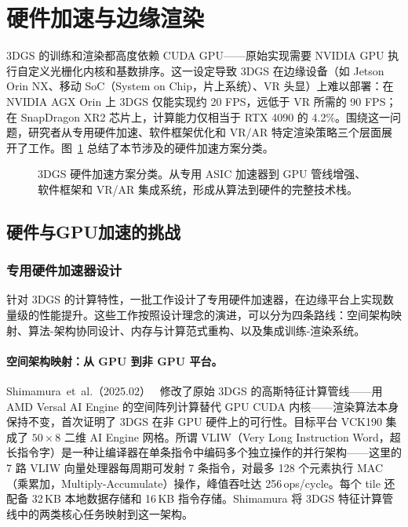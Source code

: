 \section{硬件加速与边缘渲染}
\label{sec:02_7}

3DGS 的训练和渲染都高度依赖 CUDA GPU——原始实现需要 NVIDIA GPU 执行自定义光栅化内核和基数排序。这一设定导致 3DGS 在边缘设备（如 Jetson Orin NX、移动 SoC（System on Chip，片上系统）、VR 头显）上难以部署：在 NVIDIA AGX Orin 上 3DGS 仅能实现约 20 FPS，远低于 VR 所需的 90 FPS；在 SnapDragon XR2 芯片上，计算能力仅相当于 RTX 4090 的 4.2\%。围绕这一问题，研究者从专用硬件加速、软件框架优化和 VR/AR 特定渲染策略三个层面展开了工作。图~\ref{fig:02_hw_accel} 总结了本节涉及的硬件加速方案分类。

\begin{figure}[htbp]
\centering
\resizebox{0.9\textwidth}{!}{}
\caption{3DGS 硬件加速方案分类。从专用 ASIC 加速器到 GPU 管线增强、软件框架和 VR/AR 集成系统，形成从算法到硬件的完整技术栈。}
\label{fig:02_hw_accel}
\end{figure}

\subsection{硬件与GPU加速的挑战}

\subsubsection{专用硬件加速器设计}

针对 3DGS 的计算特性，一批工作设计了专用硬件加速器，在边缘平台上实现数量级的性能提升。这些工作按照设计理念的演进，可以分为四条路线：空间架构映射、算法-架构协同设计、内存与计算范式重构、以及集成训练-渲染系统。

\paragraph{空间架构映射：从 GPU 到非 GPU 平台。}

Shimamura~et~al.（2025.02）~\cite{2502_11782} 修改了原始 3DGS 的高斯特征计算管线——用 AMD Versal AI Engine 的空间阵列计算替代 GPU CUDA 内核——渲染算法本身保持不变，首次证明了 3DGS 在非 GPU 硬件上的可行性。目标平台 VCK190 集成了 $50\times 8$ 二维 AI Engine 网格。所谓 VLIW（Very Long Instruction Word，超长指令字）是一种让编译器在单条指令中编码多个独立操作的并行架构——这里的 7 路 VLIW 向量处理器每周期可发射 7 条指令，对最多 128 个元素执行 MAC（乘累加，Multiply-Accumulate）操作，峰值吞吐达 256\,ops/cycle。每个 tile 还配备 32\,KB 本地数据存储和 16\,KB 指令存储。Shimamura 将 3DGS 特征计算管线中的两类核心任务映射到这一架构。

